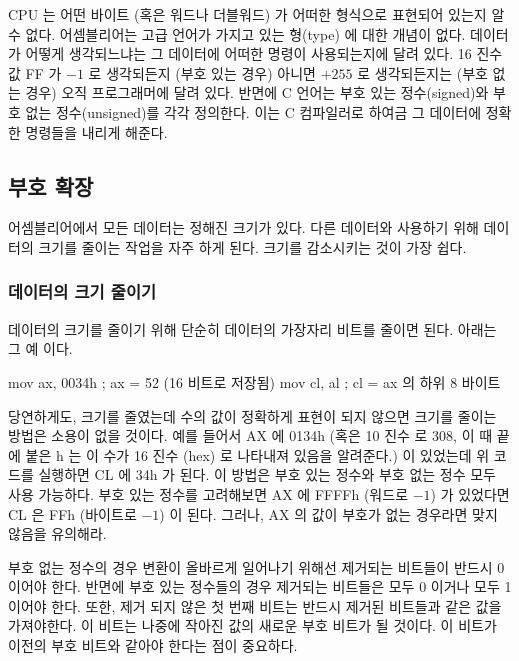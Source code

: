 CPU 는 어떤 바이트 (혹은 워드나 더블워드) 가 어떠한 형식으로 표현되어 있는지 알 수 없다. 어셈블리어는 고급 언어가 가지고 있는 형(type) 에 대한 
개념이 없다. 데이터가 어떻게 생각되느냐는 그 데이터에 어떠한 명령이 사용되는지에 달려 있다. 16 진수 값 FF 가 $-1$ 로 생각되든지 (부호 있는 경우) 
아니면 $+255$ 로 생각되든지는 (부호 없는 경우) 오직 프로그래머에 달려 있다. 반면에 C 언어는 부호 있는 정수(signed)와 부호 없는 정수(unsigned)를 각각 정의한다. 
이는 C 컴파일러로 하여금 그 데이터에 정확한 명령들을 내리게 해준다. 


\subsection{부호 확장}

어셈블리어에서 모든 데이터는 정해진 크기가 있다. 다른 데이터와 사용하기 위해 데이터의 크기를 줄이는 작업을 자주 하게 된다. 크기를 감소시키는 것이
가장 쉽다. 

\subsubsection{데이터의 크기 줄이기}

데이터의 크기를 줄이기 위해 단순히 데이터의 가장자리 비트를 줄이면 된다. 아래는 그 예 이다. 

\begin{AsmCodeListing}[numbers=none,frame=none]
      mov    ax, 0034h      ; ax = 52 (16 비트로 저장됨)
      mov    cl, al         ; cl = ax 의 하위 8 바이트
\end{AsmCodeListing}

당연하게도, 크기를 줄였는데 수의 값이 정확하게 표현이 되지 않으면 크기를 줄이는 방법은 소용이 없을 것이다. 예를 들어서 {\code AX}  에 0134h (혹은 10 진수
로 308, 이 때 끝에 붙은 h 는 이 수가 16 진수 (hex) 로 나타내져 있음을 알려준다.) 이 있었는데 위 코드를 실행하면 {\code CL} 에 34h 가 된다. 이 방법은 부호 
있는 정수와 부호 없는 정수 모두 사용 가능하다. 부호 있는 정수를 고려해보면 {\code AX} 에 FFFFh (워드로 $-1$) 가 있었다면 {\code CL} 은 FFh (바이트로 
$-1$) 이 된다. 그러나, {\code AX} 의 값이 부호가 없는 경우라면 맞지 않음을 유의해라. 

부호 없는 정수의 경우 변환이 올바르게 일어나기 위해선 제거되는 비트들이
반드시 0 이어야 한다. 반면에 부호 있는 정수들의 경우 제거되는
비트들은 모두 0 이거나 모두 1 이어야 한다. 또한, 제거 되지 않은 첫 번째 비트는 
반드시 제거된 비트들과 같은 값을 가져야한다.
이 비트는 나중에 작아진 값의 새로운 부호 비트가 될 것이다.
이 비트가 이전의 부호 비트와 같아야 한다는 점이 중요하다.  

